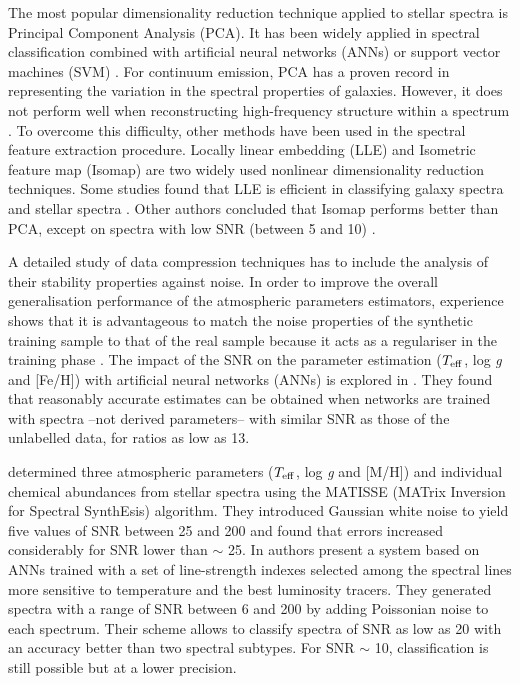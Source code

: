 \documentclass[a4paper,fleqn,usenatbib]{mnras}
\begin{document}
{The most popular dimensionality reduction technique applied
to stellar spectra is Principal Component Analysis (PCA). It has
been widely applied in spectral classification combined with
artificial neural networks (ANNs) \citep{singh:98} or support vector
machines (SVM) \citep{fiorentin:08b}. For continuum emission, PCA has a
proven record in representing the variation in the spectral properties
of galaxies. However, it does not perform well when reconstructing
high-frequency structure within a spectrum \citep{vanderplas:09}. To
overcome this difficulty, other methods have been used in the
spectral feature extraction procedure. Locally linear embedding
(LLE) \citep{roweisLLE:00} and Isometric feature map (Isomap) 
\citep{tenenbaum:00} are two widely used nonlinear dimensionality 
reduction techniques. Some studies found that LLE is efficient in 
classifying galaxy spectra \citep{vanderplas:09} and stellar spectra 
\citep{daniel:11}. Other authors concluded that Isomap performs better 
than PCA, except on spectra with low SNR (between 5 and 10) \citep{bu:14}.

A detailed study of data compression techniques has to include
the analysis of their stability properties against noise. In order
to improve the overall generalisation performance of the atmospheric
parameters estimators, experience shows that it is advantageous to
match the noise properties of the synthetic training sample to that of
the real sample because it acts as a regulariser in the training phase
\citep{fiorentin:08a}.  The impact of the SNR on the parameter
estimation ($T_{\rm eff}$, log \textit{g} and [Fe/H]) with artificial
neural networks (ANNs) is explored in \cite{snider:01}. They found
that reasonably accurate estimates can be obtained when networks are
trained with spectra --not derived parameters-- with similar SNR 
as those of the unlabelled data, for ratios as low as 13.


\cite{recio:06} determined three atmospheric parameters
($T_{\rm eff}$, log \textit{g} and [M/H]) and individual chemical
abundances from stellar spectra using the MATISSE (MATrix
Inversion for Spectral SynthEsis) algorithm. They introduced Gaussian
white noise to yield five values of SNR between 25 and 200 and found
that errors increased considerably for SNR lower than $\sim$ 25.  In
\cite{navarro:12} authors present a system based on ANNs trained with
a set of line-strength indexes selected among the spectral lines more
sensitive to temperature and the best luminosity tracers. They
generated spectra with a range of SNR between 6 and 200 by adding
Poissonian noise to each spectrum. Their scheme allows to classify
spectra of SNR as low as 20 with an accuracy better than two spectral
subtypes. For SNR $\sim$ 10, classification is still possible but at a
lower precision.

}
\end{document}
